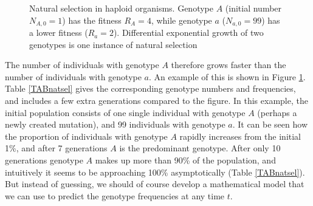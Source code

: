 \documentclass[11pt,a4paper]{book}
\begin{document}
\begin{figure}[!t]
\begin{center}
\caption{\small Natural selection in haploid organisms. Genotype $A$ (initial number $N_{A,0}=1$) has the fitness $R_A=4$, while genotype $a$ ($N_{a,0}=99$) has a lower fitness ($R_a=2$). Differential exponential growth of two genotypes is one instance of natural selection}
\label{FIGnatsel}
\end{center}
\end{figure}

The number of individuals with genotype $A$ therefore grows faster than the number of individuals with genotype $a$. An example of this is shown in Figure \ref{FIGnatsel}. Table \ref{TABnatsel} gives the corresponding genotype numbers and frequencies,  and includes a few extra generations compared to the figure. In this example, the initial population consists of one single individual with genotype $A$ (perhaps a newly created mutation), and 99 individuals with genotype $a$. It can be seen how the proportion of individuals with genotype $A$ rapidly increases from the initial 1\%, and after 7 generations $A$ is the predominant genotype. After only 10 generations genotype $A$ makes up more than 90\% of the population, and intuitively it seems to be approaching 100\% asymptotically (Table \ref{TABnatsel}). But instead of guessing, we should of course develop a  mathematical model that we can use to predict the genotype frequencies at any time $t$. 
\end{document}
